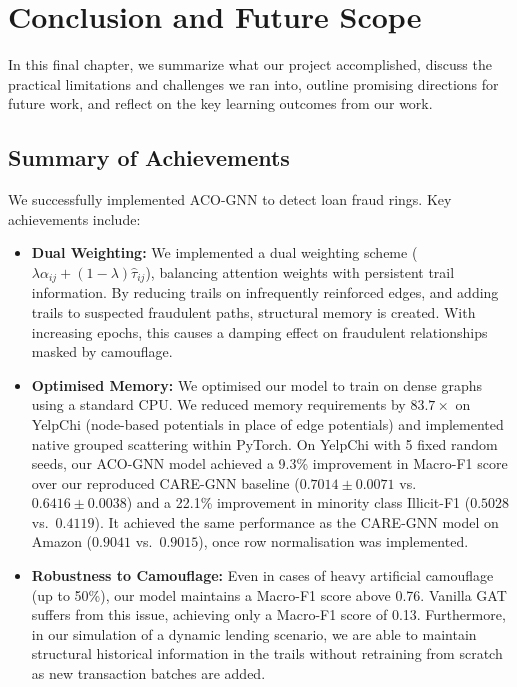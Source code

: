 \chapter{Conclusion and Future Scope}
\label{ch:conclusion}

In this final chapter, we summarize what our project accomplished, discuss the practical limitations and challenges we ran into, outline promising directions for future work, and reflect on the key learning outcomes from our work.

\section[Summary of Achievements]{\textbf{Summary of Achievements}}
\label{sec:achievements_summary}

We successfully implemented ACO-GNN to detect loan fraud rings. Key achievements include:

\begin{itemize}
    \item \textbf{Dual Weighting:} We implemented a dual weighting scheme ($\lambda \alpha_{ij} + (1-\lambda)\hat{\tau}_{ij}$), balancing attention weights with persistent trail information. By reducing trails on infrequently reinforced edges, and adding trails to suspected fraudulent paths, structural memory is created. With increasing epochs, this causes a damping effect on fraudulent relationships masked by camouflage.
    \item \textbf{Optimised Memory:} We optimised our model to train on dense graphs using a standard CPU. We reduced memory requirements by $83.7\times$ on YelpChi (node-based potentials in place of edge potentials) and implemented native grouped scattering within PyTorch. On YelpChi with 5 fixed random seeds, our ACO-GNN model achieved a 9.3\% improvement in Macro-F1 score over our reproduced CARE-GNN baseline ($0.7014 \pm 0.0071$ vs.\ $0.6416 \pm 0.0038$) and a 22.1\% improvement in minority class Illicit-F1 ($0.5028$ vs.\ $0.4119$). It achieved the same performance as the CARE-GNN model on Amazon ($0.9041$ vs.\ $0.9015$), once row normalisation was implemented.
    \item \textbf{Robustness to Camouflage:} Even in cases of heavy artificial camouflage (up to 50\%), our model maintains a Macro-F1 score above 0.76. Vanilla GAT suffers from this issue, achieving only a Macro-F1 score of 0.13. Furthermore, in our simulation of a dynamic lending scenario, we are able to maintain structural historical information in the trails without retraining from scratch as new transaction batches are added.
\end{itemize}

